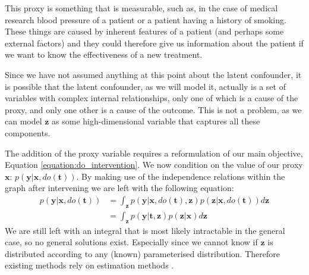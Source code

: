 \documentclass{report}
\newcommand{\bt}{\mathbf{t}}
\newcommand{\bx}{\mathbf{x}}
\newcommand{\by}{\mathbf{y}}
\newcommand{\bz}{\mathbf{z}}
\begin{document}
This proxy is something that is measurable, such as, in the case of medical research blood pressure of a patient or a patient having a history of smoking. These things are caused by inherent features of a patient (and perhaps some external factors) and they could therefore give us information about the patient if we want to know the effectiveness of a new treatment. 

Since we have not assumed anything at this point about the latent confounder, it is possible that the latent confounder, as we will model it, actually is a set of variables with complex internal relationships, only one of which is a cause of the proxy, and only one other is a cause of the outcome. This is not a problem, as we can model $\bz$ as some high-dimensional variable that captures all these components.

The addition of the proxy variable requires a reformulation of our main objective, Equation \ref{equation:do_intervention}. We now condition on the value of our proxy $\bx$: $p(\by |\bx, do(\bt))$. By making use of the independence relations within the graph after intervening we are left with the following equation:
\begin{equation}\label{equation:prediction_of_do_t}
    \begin{split}
        p(\by | \bx, do(\bt)) &= \int_{\bz} p(\by | \bx, do(\bt), \bz) p(\bz | \bx, do(\bt)) d\bz\\
        &= \int_{\bz} p(\by|\bt, \bz) p(\bz|\bx) d\bz
    \end{split}
\end{equation}
We are still left with an integral that is most likely intractable in the general case, so no general solutions exist. Especially since we cannot know if $\bz$ is distributed according to any (known) parameterised distribution. Therefore existing methods rely on estimation methods \parencite[]{bishop2006pattern}. 

\end{document}
